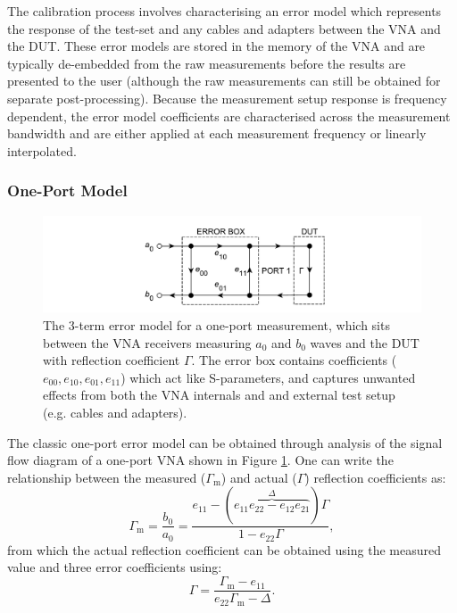 \documentclass[../thesis/thesis.tex]{subfiles}
\begin{document}
\begin{refsection}
The calibration process involves characterising an error model which represents the response of the test-set and any cables and adapters between the VNA and the DUT. These error models are stored in the memory of the VNA and are typically de-embedded from the raw measurements before the results are presented to the user (although the raw measurements can still be obtained for separate post-processing). Because the measurement setup response is frequency dependent, the error model coefficients are characterised across the measurement bandwidth and are either applied at each measurement frequency or linearly interpolated.

\subsubsection{One-Port Model}

\begin{figure}
	\centering
	\includegraphics[width=\textwidth]{ch2_oneport}
	\caption{The 3-term error model for a one-port measurement, which sits between the VNA receivers measuring $a_0$ and $b_0$ waves and the DUT with reflection coefficient $\Gamma$. The error box contains coefficients ($e_{00}, e_{10}, e_{01}, e_{11}$) which act like S-parameters, and captures unwanted effects from both the VNA internals and and external test setup (e.g. cables and adapters).}
	\label{ch2_fig_oneport}
\end{figure}

The classic one-port error model can be obtained through analysis of the signal flow diagram of a one-port VNA shown in Figure \ref{ch2_fig_oneport}. One can write the relationship between the measured ($\Gamma_\textrm{m}$) and actual ($\Gamma$) reflection coefficients as:
\begin{equation}
\Gamma_\textrm{m}=\frac{b_0}{a_0}=\frac{e_{11}-(\overbrace{e_{11}e_{22}-e_{12}e_{21}}^\Delta)\Gamma}{1-e_{22}\Gamma},
\end{equation}
from which the actual reflection coefficient can be obtained using the measured value and three error coefficients using:
\begin{equation}
\Gamma=\frac{\Gamma_\textrm{m}-e_{11}}{e_{22}\Gamma_\textrm{m}-\Delta}.
\label{ch2_eqn_oneport1}
\end{equation}


\end{refsection}
\end{document}
